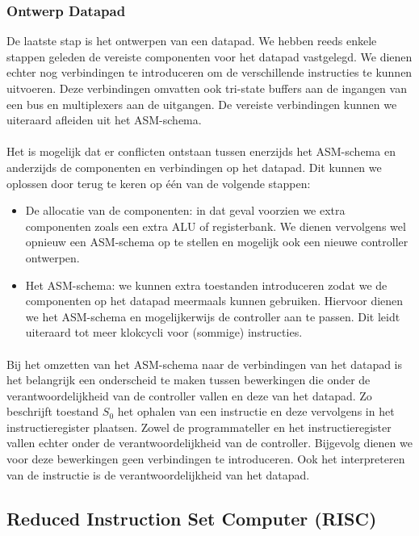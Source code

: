 \subsubsection{Ontwerp Datapad}
De laatste stap is het ontwerpen van een datapad. We hebben reeds enkele stappen geleden de vereiste componenten voor het datapad vastgelegd. We dienen echter nog verbindingen te introduceren om de verschillende instructies te kunnen uitvoeren. Deze verbindingen omvatten ook tri-state buffers aan de ingangen van een bus en multiplexers aan de uitgangen. De vereiste verbindingen kunnen we uiteraard afleiden uit het ASM-schema.
\paragraph{}
Het is mogelijk dat er conflicten ontstaan tussen enerzijds het ASM-schema en anderzijds de componenten en verbindingen op het datapad. Dit kunnen we oplossen door terug te keren op \'e\'en van de volgende stappen:
\begin{itemize}
 \item De allocatie van de componenten: in dat geval voorzien we extra componenten zoals een extra ALU of registerbank. We dienen vervolgens wel opnieuw een ASM-schema op te stellen en mogelijk ook een nieuwe controller ontwerpen.
 \item Het ASM-schema: we kunnen extra toestanden introduceren zodat we de componenten op het datapad meermaals kunnen gebruiken. Hiervoor dienen we het ASM-schema en mogelijkerwijs de controller aan te passen. Dit leidt uiteraard tot meer klokcycli voor (sommige) instructies.
\end{itemize}
\paragraph{}
Bij het omzetten van het ASM-schema naar de verbindingen van het datapad is het belangrijk een onderscheid te maken tussen bewerkingen die onder de verantwoordelijkheid van de controller vallen en deze van het datapad. Zo beschrijft toestand $S_0$ het ophalen van een instructie en deze vervolgens in het instructieregister plaatsen. Zowel de programmateller en het instructieregister vallen echter onder de verantwoordelijkheid van de controller. Bijgevolg dienen we voor deze bewerkingen geen verbindingen te introduceren. Ook het interpreteren van de instructie is de verantwoordelijkheid van het datapad.
\subsection{Reduced Instruction Set Computer (RISC)}
